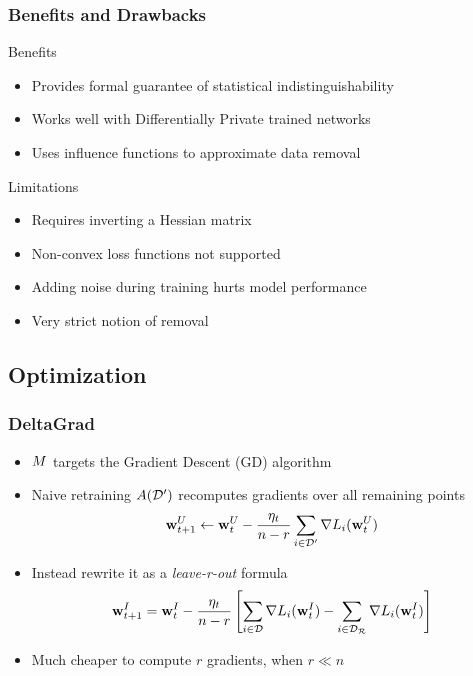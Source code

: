 \documentclass[pdf]{beamer}
\begin{document}
\begin{frame}
  \frametitle{Benefits and Drawbacks}
  \begin{block}{Benefits}
    \begin{itemize}
      \item Provides formal guarantee of statistical indistinguishability
      \item Works well with Differentially Private trained networks
      \item Uses influence functions to approximate data removal
    \end{itemize}    
  \end{block}
  \begin{alertblock}{Limitations}
    \begin{itemize}
      \item Requires inverting a Hessian matrix
      \item Non-convex loss functions not supported 
      \item Adding noise during training hurts model performance
      \item Very strict notion of removal
    \end{itemize}
    
  \end{alertblock}
\end{frame}
\subsection{Optimization}
\begin{frame}
  \myNset[2]
  \smartart
\end{frame}

\begin{frame}
  \frametitle{
    DeltaGrad \cite{wuDeltaGradRapidRetraining2020}
    }
  \begin{itemize}
    \item $M$ targets the Gradient Descent (GD) algorithm
    \item Naive retraining $A(\mathcal{D}^{\prime})$ recomputes gradients over all remaining points
    \[
        \textbf{w}^{U}_{t+1} \leftarrow \textbf{w}^{U}_{t} - \frac{\eta_{t}}{n-r}\sum_{i\in \mathcal{D}^{\prime}}\nabla L_{i}(\textbf{w}^{U}_{t})
    \]
    \item Instead rewrite it as a \textit{leave-r-out} formula
    \[
      \textbf{w}^{I}_{t+1} = \textbf{w}^{I}_{t} - \frac{\eta_{t}}{n-r}\left[\sum_{i\in \mathcal{D}}\nabla L_{i}(\textbf{w}^{I}_{t}) -\sum_{i\in \mathcal{D_{R}}} \nabla L_{i}(\textbf{w}^{I}_{t})\right]
    \]
    \item Much cheaper to compute $r$ gradients, when $r \ll n$
  \end{itemize}

\end{frame}
\end{document}

